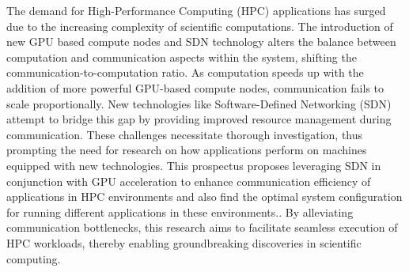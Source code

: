 The demand for High-Performance Computing (HPC) applications has surged due to
the increasing complexity of scientific computations. The introduction of
new GPU based compute nodes and SDN technology alters the balance between
computation and communication aspects within the system, shifting the
communication-to-computation ratio. As computation speeds up with the addition
of more powerful GPU-based compute nodes, communication fails to scale
proportionally. New technologies like Software-Defined Networking (SDN) attempt
to bridge this gap by providing improved resource management during
communication.  These challenges necessitate thorough investigation, thus
prompting the need for research on how applications perform on machines equipped
with new technologies. This prospectus proposes leveraging SDN in conjunction
with GPU acceleration to enhance communication efficiency of applications in HPC
environments and also find the optimal system configuration for running
different applications in these environments.. By alleviating communication
bottlenecks, this research aims to facilitate seamless execution of HPC
workloads, thereby enabling groundbreaking discoveries in scientific computing.
